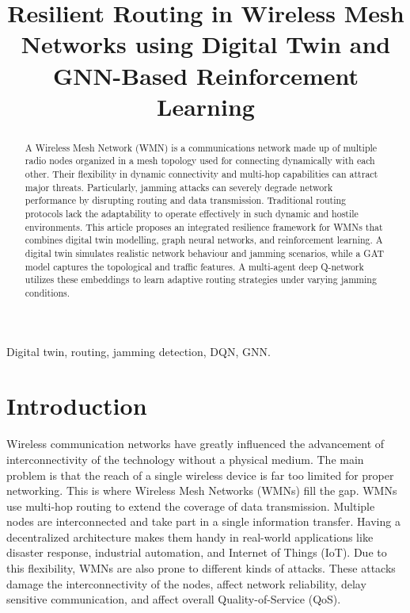 \documentclass[conference]{IEEEtran}
\begin{document}
\title{Resilient Routing in Wireless Mesh Networks using Digital Twin and GNN-Based Reinforcement Learning}

\author{
}

\maketitle

\begin{abstract}
A Wireless Mesh Network (WMN) is a communications network made up of multiple radio nodes organized in a mesh topology used for connecting dynamically with each other. Their flexibility in dynamic connectivity and multi-hop capabilities can attract major threats. Particularly, jamming attacks can severely degrade network performance by disrupting routing and data transmission. Traditional routing protocols lack the adaptability to operate effectively in such dynamic and hostile environments. This article proposes an integrated resilience framework for WMNs that combines digital twin modelling, graph neural networks, and reinforcement learning. A digital twin simulates realistic network behaviour and jamming scenarios, while a GAT model captures the topological and traffic features. A multi-agent deep Q-network utilizes these embeddings to learn adaptive routing strategies under varying jamming conditions.
\end{abstract}

\begin{IEEEkeywords}
Digital twin, routing, jamming detection, DQN, GNN.
\end{IEEEkeywords}

\section{Introduction}

Wireless communication networks have greatly influenced the advancement of interconnectivity of the technology without a physical medium. The main problem is that the reach of a single wireless device is far too limited for proper networking. This is where Wireless Mesh Networks (WMNs) fill the gap. WMNs use multi-hop routing to extend the coverage of data transmission. Multiple nodes are interconnected and take part in a single information transfer. Having a decentralized architecture makes them handy in real-world applications like disaster response, industrial automation, and Internet of Things (IoT). Due to this flexibility, WMNs are also prone to different kinds of attacks. These attacks damage the interconnectivity of the nodes, affect network reliability, delay sensitive communication, and affect overall Quality-of-Service (QoS).
\end{document}
